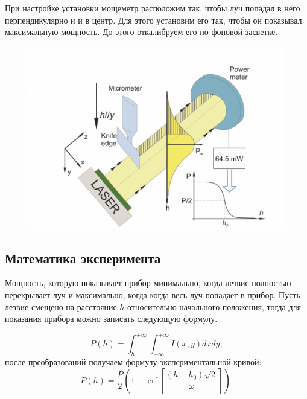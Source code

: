 \documentclass[a4paper,14pt]{extarticle}
\DeclareMathOperator\erf{erf}
\begin{document}
При настройке установки мощеметр расположим так, чтобы луч попадал в него перпендикулярно и и в центр. Для этого установим его так, чтобы он показывал максимальную мощность. До этого откалибруем его по фоновой засветке. 
\begin{figure}[H]
	\includegraphics[scale=0.7]{knife1}
\end{figure}

\subsection{Математика эксперимента}

Мощность, которую показывает прибор минимально, когда лезвие полностью перекрывает луч и максимально, когда когда весь луч попадает в прибор. Пусть лезвие смещено на расстояние $h$ относительно начального положения, тогда для показания прибора можно записать следующую формулу. 

$$P(h) = \int^{+\infty}_{h} \int^{+ \infty}_{-\infty} I(x, y) dx dy,$$
после преобразований получаем формулу экспериментальной кривой: 
$$P(h) = \frac{P}{2} \left( 1 - \erf  \left[ \frac{(h - h_0) \sqrt{2}}{\omega} \right] \right).$$
\end{document}
